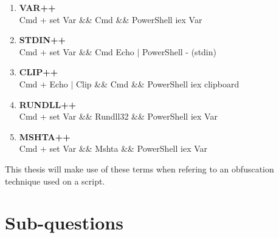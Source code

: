 \documentclass{article}%
\begin{document}
\begin{itemize}
\begin{enumerate}
		\item \textbf{VAR++}    	
		\\Cmd + set Var \&\& Cmd \&\& PowerShell iex Var
		\item \textbf{STDIN++}   	
		\\Cmd + set Var \&\& Cmd Echo $|$ PowerShell - (stdin)
		\item \textbf{CLIP++}    	
		\\Cmd + Echo $|$ Clip \&\& Cmd \&\& PowerShell iex clipboard
		\item \textbf{RUNDLL++}		
		\\Cmd + set Var \&\& Rundll32 \&\& PowerShell iex Var
		\item \textbf{MSHTA++}   	
		\\Cmd + set Var \&\& Mshta \&\& PowerShell iex Var
	\end{enumerate}
\end{itemize}
This thesis will make use of these terms when refering to an obfuscation technique used on a script.

\section{Sub-questions}
\end{document}
